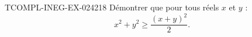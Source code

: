 \begin{exercice}{TCOMPL-INEG-EX-024}{2}{18}
Démontrer que pour tous réels $x$ et $y$ :
\[ x^2 + y^2 \geq \frac{(x+y)^2}{2}. \]

\end{exercice}
